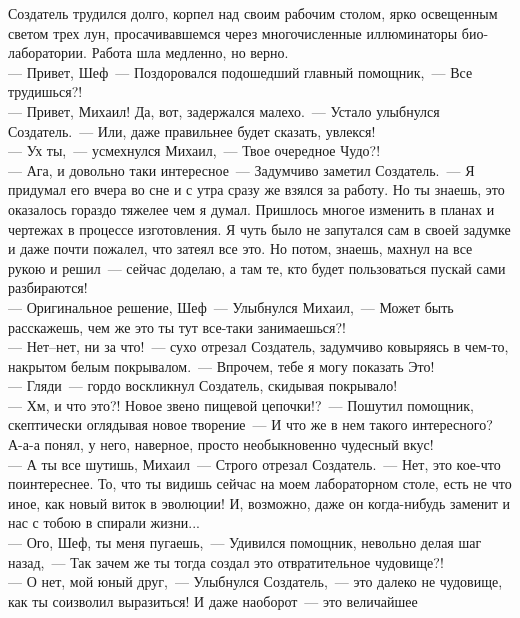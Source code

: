 
Создатель трудился долго, корпел над своим рабочим столом, ярко освещенным 
светом трех лун, просачивавшемся через многочисленные иллюминаторы 
био-лаборатории. Работа шла медленно, но верно.\\
--- Привет, Шеф~--- Поздоровался подошедший главный помощник,~--- Все 
трудишься?!\\
--- Привет, Михаил! Да, вот, задержался малехо.~--- Устало улыбнулся 
Создатель.~--- Или, даже правильнее будет сказать, увлекся!\\
--- Ух ты,~--- усмехнулся Михаил,~--- Твое очередное Чудо?!\\
--- Ага, и довольно таки интересное~--- Задумчиво заметил Создатель.~--- Я 
придумал его вчера во сне и с утра сразу же взялся за работу. Но ты знаешь, это 
оказалось гораздо тяжелее чем я думал. Пришлось многое изменить в планах и 
чертежах в процессе изготовления. Я чуть было не запутался сам в своей задумке 
и 
даже почти пожалел, что затеял все это. Но потом, знаешь, махнул на все рукою и 
решил~--- сейчас доделаю, а там те, кто будет пользоваться пускай сами 
разбираются!\\
--- Оригинальное решение, Шеф~--- Улыбнулся Михаил,~--- Может быть 
расскажешь, чем же это ты тут все-таки занимаешься?!\\
--- Нет--нет, ни за что!~--- сухо отрезал Создатель, задумчиво ковыряясь в 
чем-то, накрытом белым покрывалом.~--- Впрочем, тебе я могу показать Это!\\
--- Гляди~--- гордо воскликнул Создатель, скидывая покрывало!\\
--- Хм, и что это?! Новое звено пищевой цепочки!?~---  Пошутил помощник, 
скептически оглядывая новое творение~--- И что же в нем такого интересного? 
А-а-а понял, у него, наверное, просто необыкновенно чудесный вкус!\\
--- А ты все шутишь, Михаил~--- Строго отрезал Создатель.~--- Нет, это 
кое-что 
поинтереснее. То, что ты видишь сейчас на моем лабораторном столе, есть 
не что иное, как новый виток в эволюции! И, возможно, даже он 
когда-нибудь заменит и нас с тобою в спирали жизни...\\
--- Ого, Шеф, ты меня пугаешь,~--- Удивился помощник, невольно делая шаг 
назад,~--- Так зачем же ты тогда создал это отвратительное чудовище?!\\
--- О нет, мой юный друг,~--- Улыбнулся Создатель,~--- это далеко не 
чудовище, как ты соизволил выразиться! И даже наоборот~--- это величайшее 

